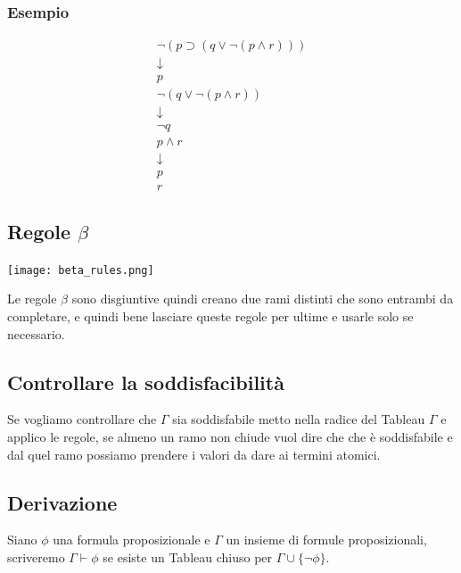 \documentclass[../main.tex]{subfiles}
\begin{document}
    \subsubsection{Esempio}
    \begin{gather*}
        \lnot (p \supset (q \lor \lnot (p \land r )))\\
        \downarrow\\
        p\\
        \lnot (q \lor \lnot (p \land r ))\\
        \downarrow\\
        \lnot q\\
        p \land r\\
        \downarrow\\
        p\\
        r 
    \end{gather*}

    \subsection{Regole $\beta$}
    \begin{center}
        \texttt{[image: beta\_rules.png]}
    \end{center}
    Le regole $\beta$ sono disgiuntive quindi creano due rami distinti che sono entrambi da completare, e quindi bene lasciare queste regole per ultime e usarle solo se necessario.

    \subsection{Controllare la soddisfacibilità}
    Se vogliamo controllare che $\Gamma$ sia soddisfabile metto nella radice del Tableau $\Gamma$ e applico le regole, se almeno un ramo non chiude vuol dire che che è soddisfabile e dal quel ramo possiamo prendere i valori da dare ai termini atomici.

    \subsection{Derivazione}
    Siano $\phi$ una formula proposizionale e $\Gamma$ un insieme di formule proposizionali, scriveremo $\Gamma \vdash \phi$ se esiste un Tableau chiuso per $\Gamma \cup \{\lnot \phi\}$.
\end{document}
